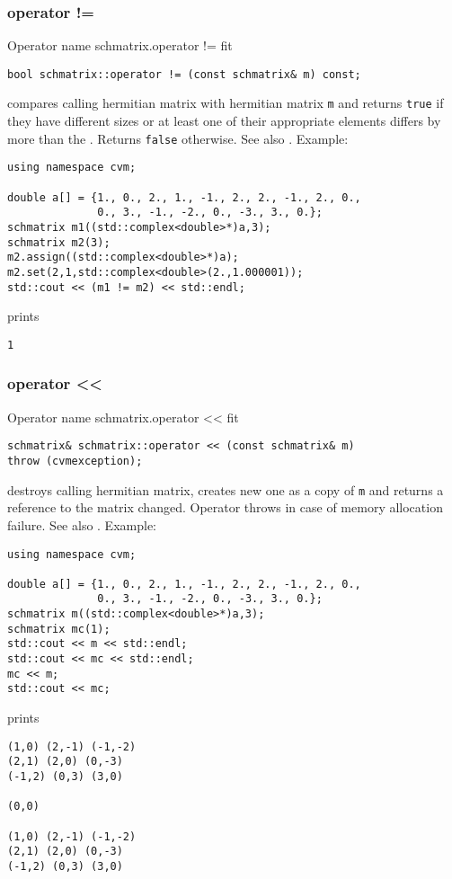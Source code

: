 \subsubsection{operator !=}
Operator%
\pdfdest name {schmatrix.operator !=} fit
\begin{verbatim}
bool schmatrix::operator != (const schmatrix& m) const;
\end{verbatim}
compares  calling hermitian matrix with  hermitian matrix \verb"m"
and returns \verb"true" if they have different sizes
or at least one of their appropriate elements
differs by more than the
.
Returns \verb"false" otherwise.
See also .
Example:
\begin{Verbatim}
using namespace cvm;

double a[] = {1., 0., 2., 1., -1., 2., 2., -1., 2., 0.,
              0., 3., -1., -2., 0., -3., 3., 0.};
schmatrix m1((std::complex<double>*)a,3);
schmatrix m2(3);
m2.assign((std::complex<double>*)a);
m2.set(2,1,std::complex<double>(2.,1.000001));
std::cout << (m1 != m2) << std::endl;
\end{Verbatim}
prints
\begin{Verbatim}
1
\end{Verbatim}
\newpage



\subsubsection{operator <{}<}
Operator%
\pdfdest name {schmatrix.operator <<} fit
\begin{verbatim}
schmatrix& schmatrix::operator << (const schmatrix& m)
throw (cvmexception);
\end{verbatim}
destroys  calling hermitian matrix, creates  new one as a copy of \verb"m"
and returns a reference to
the matrix changed.
Operator throws  
in case of memory allocation failure.
See also .
Example:
\begin{Verbatim}
using namespace cvm;

double a[] = {1., 0., 2., 1., -1., 2., 2., -1., 2., 0.,
              0., 3., -1., -2., 0., -3., 3., 0.};
schmatrix m((std::complex<double>*)a,3);
schmatrix mc(1);
std::cout << m << std::endl;
std::cout << mc << std::endl;
mc << m;
std::cout << mc;
\end{Verbatim}
prints
\begin{Verbatim}
(1,0) (2,-1) (-1,-2)
(2,1) (2,0) (0,-3)
(-1,2) (0,3) (3,0)

(0,0)

(1,0) (2,-1) (-1,-2)
(2,1) (2,0) (0,-3)
(-1,2) (0,3) (3,0)
\end{Verbatim}
\newpage



